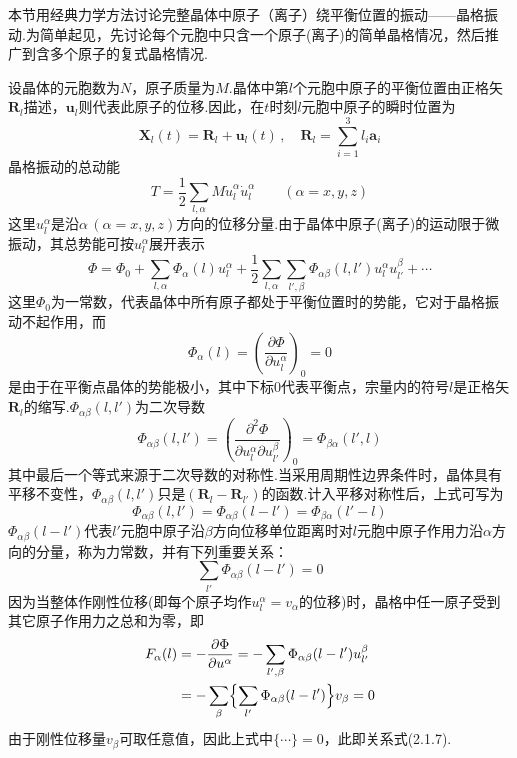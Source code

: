 本节用经典力学方法讨论完整晶体中原子（离子）绕平衡位置的振动——晶格振动.为简单起见，先讨论每个元胞中只含一个原子(离子)的简单晶格情况，然后推广到含多个原子的复式晶格情况.

设晶体的元胞数为$N$，原子质量为$M$.晶体中第$l$个元胞中原子的平衡位置由正格矢$\boldsymbol{R}_l$描述，$\boldsymbol{u}_l$则代表此原子的位移.因此，在$t$时刻$l$元胞中原子的瞬时位置为
\begin{equation}
  \boldsymbol{X}_l(t)=\boldsymbol{R}_l+\boldsymbol{u}_l(t)\,,\quad
  \boldsymbol{R}_l=\sum_{i=1}^{3}l_i\boldsymbol{a}_i
\end{equation}
晶格振动的总动能
\begin{equation}
  T=\frac{1}{2}\sum_{l,\alpha}M\dot{u}_l^{\alpha}\dot{u}_l^{\alpha}
  \qquad(\alpha=x,y,z)
\end{equation}
这里$u_l^{\alpha}$是沿$\alpha\,(\alpha=x,y,z)$方向的位移分量.由于晶体中原子(离子)的运动限于微振动，其总势能可按$u_l^{\alpha}$展开表示
\begin{equation}
  \Phi=\Phi_0+\sum_{l,\alpha}\Phi_{\alpha}(l)u_l^{\alpha}
  +\frac{1}{2}\sum_{l,\alpha}\sum_{l',\beta}\Phi_{\alpha\beta}(l,l')u_l^{\alpha}u_{l'}^{\beta}+\cdots
\end{equation}
这里$\Phi_0$为一常数，代表晶体中所有原子都处于平衡位置时的势能，它对于晶格振动不起作用，而
\begin{equation}
  \Phi_{\alpha}(l)=\left(\frac{\partial\Phi}{\partial u_l^{\alpha}}\right)_0=0
\end{equation}
是由于在平衡点晶体的势能极小，其中下标0代表平衡点，宗量内的符号$l$是正格矢$\boldsymbol{R}_l$的缩写.$\Phi_{\alpha\beta}(l,l')$为二次导数
\begin{equation}
  \Phi_{\alpha\beta}(l,l')=\left(\frac{\partial^2\Phi}
  {\partial u_l^{\alpha}\partial u_{l'}^{\beta}}\right)_0
  =\Phi_{\beta\alpha}(l',l)
\end{equation}
其中最后一个等式来源于二次导数的对称性.当采用周期性边界条件时，晶体具有平移不变性，$\Phi_{\alpha\beta}(l,l')$只是$(\boldsymbol{R}_l-\boldsymbol{R}_{l'})$的函数.计入平移对称性后，上式可写为
\begin{equation}
  \Phi_{\alpha\beta}(l,l')=\Phi_{\alpha\beta}(l-l')=\Phi_{\beta\alpha}(l'-l)
\end{equation}
$\Phi_{\alpha\beta}(l-l')$代表$l'$元胞中原子沿$\beta$方向位移单位距离时对$l$元胞中原子作用力沿$\alpha$方向的分量，称为力常数，并有下列重要关系：
\begin{equation}
  \sum_{l'}\Phi_{\alpha\beta}(l-l')=0
\end{equation}
因为当整体作刚性位移(即每个原子均作$u_l^{\alpha}=v_{\alpha}$的位移)时，晶格中任一原子受到其它原子作用力之总和为零，即
\begin{equation*}
\begin{aligned}
  F_{\alpha}(l)&=-\frac{\partial\Phi}{\partial u^{\alpha}}
  =-\sum_{l',\beta}\Phi_{\alpha\beta}(l-l')u_{l'}^{\beta}\\
  &=-\sum_{\beta}\Bigl\{\sum_{l'}\Phi_{\alpha\beta}(l-l')\Bigr\}v_{\beta}=0
\end{aligned}
\end{equation*}
由于刚性位移量$v_{\beta}$可取任意值，因此上式中$\{\cdots\}=0$，此即关系式(2.1.7).


